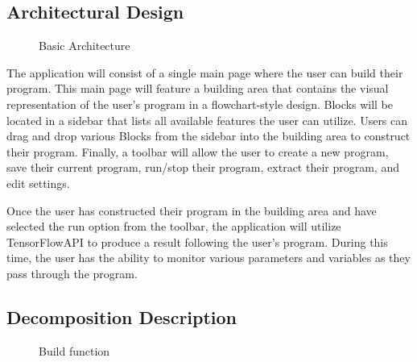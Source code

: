 \documentclass[journal,10pt,onecolumn,compsoc]{IEEEtran} \usepackage[margin=1.0in]{geometry} \usepackage{pdfpages}
\begin{document}
\subsection{Architectural Design}

\begin{figure}[H]
\caption{Basic Architecture}
\end{figure}

\noindent The application will consist of a single main page where the user can build their program. 
This main page will feature a building area that contains the visual representation of the user's program in a flowchart-style design. 
Blocks will be located in a sidebar that lists all available features the user can utilize. 
Users can drag and drop various Blocks from the sidebar into the building area to construct their program. 
Finally, a toolbar will allow the user to create a new program, save their current program, run/stop their program, extract their program, and edit settings. 

\noindent Once the user has constructed their program in the building area and have selected the run option from the toolbar, the application will utilize TensorFlow\texttrademark API to produce a result following the user's program. During this time, the user has the ability to monitor various parameters and variables as they pass through the program.

\subsection{Decomposition Description}
\begin{figure}[H]
\caption{Build function}
\end{figure}
\end{document}
